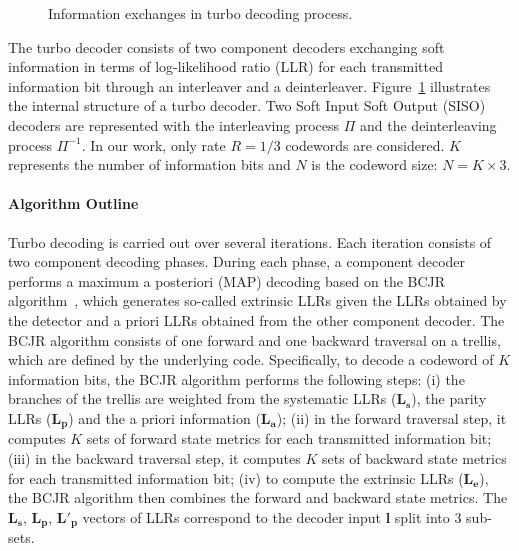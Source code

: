 \begin{figure}[htp]
  \centering
  \caption{Information exchanges in turbo decoding process.}
  \label{fig:ctx_turbo_decoder}
\end{figure}

The turbo decoder consists of two component decoders exchanging soft information
in terms of log-likelihood ratio (LLR) for each transmitted information bit
through an interleaver and a deinterleaver. Figure~\ref{fig:ctx_turbo_decoder}
illustrates the internal structure of a turbo decoder. Two Soft Input Soft
Output (SISO) decoders are represented with the interleaving process $\Pi$ and
the deinterleaving process $\Pi^{-1}$. In our work, only rate $R = 1/3$
codewords are considered. $K$ represents the number of information bits and $N$
is the codeword size: $N = K \times 3$.

\paragraph{Algorithm Outline}

Turbo decoding is carried out over several iterations. Each iteration
consists of two component decoding phases. During each phase, a component
decoder performs a maximum a posteriori (MAP) decoding based on the BCJR
algorithm~\cite{Bahl1974}, which generates so-called extrinsic LLRs given the
LLRs obtained by the detector and a priori LLRs obtained from the other
component decoder. The BCJR algorithm consists of one forward and one backward
traversal on a trellis, which are defined by the underlying code. Specifically,
to decode a codeword of $K$ information bits, the BCJR algorithm performs the
following steps: (i) the branches of the trellis are weighted from the
systematic LLRs ($\bm{L_s}$), the parity LLRs ($\bm{L_p}$) and the a priori
information ($\bm{L_a}$); (ii) in the forward traversal step, it computes $K$
sets of forward state metrics for each transmitted information bit; (iii) in the
backward traversal step, it computes $K$ sets of backward state metrics for each
transmitted information bit; (iv) to compute the extrinsic LLRs ($\bm{L_e}$),
the BCJR algorithm then combines the forward and backward state metrics. The
$\bm{L_s}$, $\bm{L_p}$, $\bm{L'_p}$ vectors of LLRs correspond to the decoder
input $\bm{l}$ split into 3 sub-sets.

